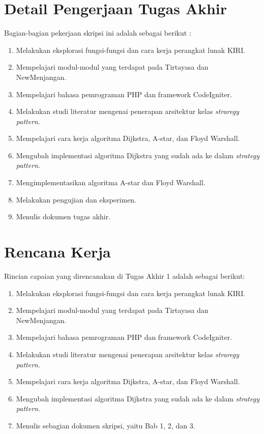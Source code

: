 \documentclass[a4paper,twoside]{article}
\begin{document}
	\section{Detail Pengerjaan Tugas Akhir}	
	Bagian-bagian pekerjaan skripsi ini adalah sebagai berikut :
    	\begin{enumerate}
    		\item Melakukan eksplorasi fungsi-fungsi dan cara kerja perangkat lunak KIRI.
                \item Mempelajari modul-modul yang terdapat pada Tirtayasa dan NewMenjangan.
                \item Mempelajari bahasa pemrograman PHP dan framework CodeIgniter.
    		\item Melakukan studi literatur mengenai penerapan arsitektur kelas \textit{straregy pattern}.
    		\item Mempelajari cara kerja algoritma Dijkstra, A-star, dan Floyd Warshall.
    		\item Mengubah implementasi algoritma Dijkstra yang sudah ada ke dalam \textit{strategy pattern}.
    		\item Mengimplementasikan algoritma A-star dan Floyd Warshall.
    		\item Melakukan pengujian dan eksperimen.
    		\item Menulis dokumen tugas akhir.
    	\end{enumerate}
	
	\section{Rencana Kerja}
	Rincian capaian yang direncanakan di Tugas Akhir 1 adalah sebagai berikut:
    	\begin{enumerate}
    		\item Melakukan eksplorasi fungsi-fungsi dan cara kerja perangkat lunak KIRI.
                \item Mempelajari modul-modul yang terdapat pada Tirtayasa dan NewMenjangan.
                \item Mempelajari bahasa pemrograman PHP dan framework CodeIgniter.
    		\item Melakukan studi literatur mengenai penerapan arsitektur kelas \textit{straregy pattern}.
    		\item Mempelajari cara kerja algoritma Dijkstra, A-star, dan Floyd Warshall.
                \item Mengubah implementasi algoritma Dijkstra yang sudah ada ke dalam \textit{strategy pattern}.
                \item Menulis sebagian dokumen skripsi, yaitu Bab 1, 2, dan 3.
    	\end{enumerate}
	
\end{document}
